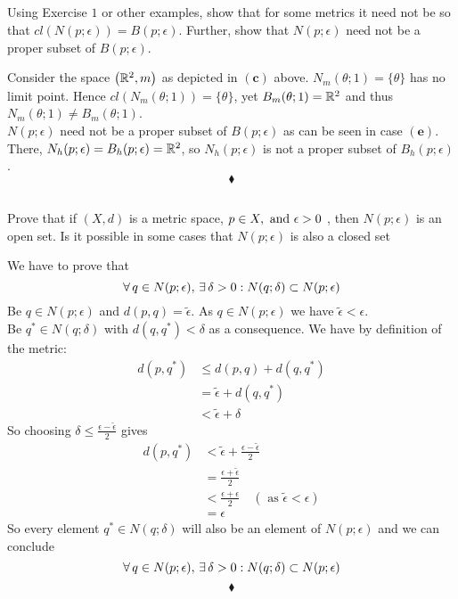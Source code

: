 \subsection{}
\begin{tcolorbox}
Using Exercise $1$ or other examples, show that for some metrics
it need not be so that $cl (N(p;\epsilon)) = B(p;\epsilon)$. Further, show that $N(p;\epsilon)$ need not be a proper subset of $B(p;\epsilon)$.
\end{tcolorbox}
Consider the space $\left(\mathbb{R}^2,m\right)$ as depicted in $\mathbf{(c)}$ above. $N_m(\theta; 1) =\{\theta\}$ has no limit point. Hence $cl\left(N_m(\theta; 1)\right) =\{\theta\}$, yet $B_m(\theta;1)=\mathbb{R}^2$ and thus $N_m(\theta; 1) \neq B_m(\theta; 1) $.\\
$N(p;\epsilon)$ need not be a proper subset of $B(p;\epsilon)$ as can be seen in case $\mathbf{(e)}$. There, $N_h(p;\epsilon)=B_h(p;\epsilon)=\mathbb{R}^2$, so $N_h(p;\epsilon)$ is not a proper subset of $B_h(p;\epsilon)$.
$$\blacklozenge$$


\subsection{}
\begin{tcolorbox}
Prove that if $\left(X,d\right)$ is a metric space, $p \in  X, \text{ and } \epsilon > 0$ , then $N(p;\epsilon)$ is an open set. Is it possible in some cases that $N(p;\epsilon)$ is also a closed set
\end{tcolorbox}
We have to prove that
$$\forall\, q\in N(p;\epsilon),\,\exists\, \delta>0: N(q;\delta)\subset N(p;\epsilon)$$
Be $q\in N(p;\epsilon)$ and $d(p,q)=\tilde{\epsilon}$. As $q\in N(p;\epsilon)$ we have $\tilde{\epsilon}<\epsilon$.\\
Be $q^*\in N(q;\delta)$ with $d(q,q^*)< \delta$ as a consequence. We have by definition of the metric:
\begin{align*}
d(p,q^*)&\leq d(p,q)+d(q,q^*)\\
&= \tilde{\epsilon}+d(q,q^*)\\
&< \tilde{\epsilon}+\delta
\end{align*}
So choosing $\delta \leq \frac{\epsilon -\tilde{\epsilon}}{2}$ gives 
\begin{align*}
d(p,q^*)&< \tilde{\epsilon}+\frac{\epsilon -\tilde{\epsilon}}{2}\\
&= \frac{\epsilon +\tilde{\epsilon}}{2}\\
&< \frac{\epsilon +{\epsilon}}{2}\quad (\text{ as }\tilde{\epsilon}<\epsilon)\\
&= \epsilon
\end{align*}
So every element $q^*\in N(q;\delta)$ will also be an element of $N(p;\epsilon)$ and we can conclude
$$\forall\, q\in N(p;\epsilon),\,\exists\, \delta>0: N(q;\delta)\subset N(p;\epsilon)$$
$$\blacklozenge$$



